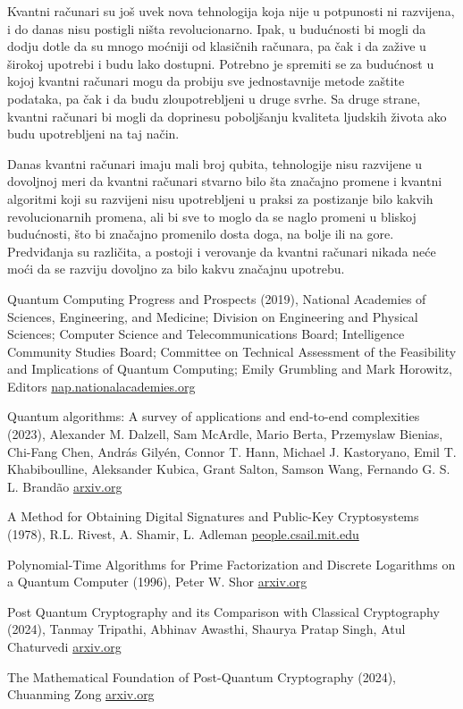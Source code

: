 \documentclass[fleqn, 12pt]{article}
\begin{document}
\begin{text}
Kvantni računari su još uvek nova tehnologija koja nije u potpunosti ni razvijena, i do danas nisu postigli ništa revolucionarno. Ipak, u budućnosti bi mogli da dodju dotle da su mnogo moćniji od klasičnih računara, pa čak i da zažive u širokoj upotrebi i budu lako dostupni. Potrebno je spremiti se za budućnost u kojoj kvantni računari mogu da probiju sve jednostavnije metode zaštite podataka, pa čak i da budu zloupotrebljeni u druge svrhe. Sa druge strane, kvantni računari bi mogli da doprinesu poboljšanju kvaliteta ljudskih života ako budu upotrebljeni na taj način. 

Danas kvantni računari imaju mali broj qubita, tehnologije nisu razvijene u dovoljnoj meri da kvantni računari stvarno bilo šta značajno promene i kvantni algoritmi koji su razvijeni nisu upotrebljeni u praksi za postizanje bilo kakvih revolucionarnih promena, ali bi sve to moglo da se naglo promeni u bliskoj budućnosti, što bi značajno promenilo dosta doga, na bolje ili na gore. Predviđanja su različita, a postoji i verovanje da kvantni računari nikada neće moći da se razviju dovoljno za bilo kakvu značajnu upotrebu.
\end{text}

\newpage
{
\raggedright
\renewcommand{\refname}{Reference}
\begin{thebibliography}{9}
     Quantum Computing Progress and Prospects (2019), National Academies of Sciences, Engineering, and Medicine; Division on Engineering and Physical Sciences; Computer Science and Telecommunications Board; Intelligence Community Studies Board; Committee on Technical Assessment of the Feasibility and Implications of Quantum Computing; Emily Grumbling and Mark Horowitz, Editors \href{https://nap.nationalacademies.org/catalog/25196/quantum-computing-progress-and-prospects}{nap.nationalacademies.org}
    
     Quantum algorithms: A survey of applications and end-to-end complexities (2023), Alexander M. Dalzell, Sam McArdle, Mario Berta, Przemyslaw Bienias, Chi-Fang Chen, András Gilyén, Connor T. Hann, Michael J. Kastoryano, Emil T. Khabiboulline, Aleksander Kubica, Grant Salton, Samson Wang, Fernando G. S. L. Brandão \href{https://arxiv.org/abs/2310.03011}{arxiv.org}
    
     A Method for Obtaining Digital Signatures and Public-Key Cryptosystems (1978), R.L. Rivest, A. Shamir, L. Adleman \href{http://people.csail.mit.edu/rivest/Rsapaper.pdf}{people.csail.mit.edu}
    
     Polynomial-Time Algorithms for Prime Factorization and Discrete Logarithms on a Quantum Computer (1996), Peter W. Shor \href{https://arxiv.org/abs/quant-ph/9508027}{arxiv.org}
    
     Post Quantum Cryptography and its Comparison with Classical Cryptography (2024), Tanmay Tripathi, Abhinav Awasthi, Shaurya Pratap Singh, Atul Chaturvedi \href{https://arxiv.org/abs/2403.19299}{arxiv.org}
    
     The Mathematical Foundation of Post-Quantum Cryptography (2024), Chuanming Zong \href{https://arxiv.org/abs/2404.19186}{arxiv.org}
\end{thebibliography}
}
\end{document}
